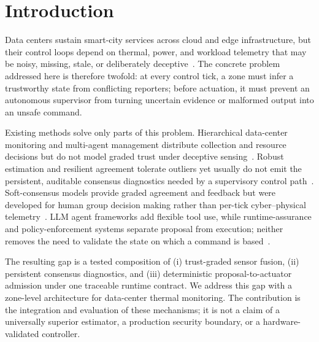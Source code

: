 \documentclass[smartcities,article,submit,moreauthors]{Definitions/mdpi}
\begin{document}
\section{Introduction}
\label{sec:introduction}

Data centers sustain smart-city services across cloud and edge infrastructure, but their control loops depend on thermal, power, and workload telemetry that may be noisy, missing, stale, or deliberately deceptive~\cite{khan2020smartcities,vitello2022,ilager2023}. The concrete problem addressed here is therefore twofold: at every control tick, a zone must infer a trustworthy state from conflicting reporters; before actuation, it must prevent an autonomous supervisor from turning uncertain evidence or malformed output into an unsafe command.

Existing methods solve only parts of this problem. Hierarchical data-center monitoring and multi-agent management distribute collection and resource decisions but do not model graded trust under deceptive sensing~\cite{jiang2019,yan2021,das2008,tesauro2004}. Robust estimation and resilient agreement tolerate outliers yet usually do not emit the persistent, auditable consensus diagnostics needed by a supervisory control path~\cite{pasqualetti2013,fawzi2014,leblanc2013}. Soft-consensus models provide graded agreement and feedback but were developed for human group decision making rather than per-tick cyber--physical telemetry~\cite{herreraviedma2002,herreraviedma2014}. LLM agent frameworks add flexible tool use, while runtime-assurance and policy-enforcement systems separate proposal from execution; neither removes the need to validate the state on which a command is based~\cite{yao2023react,popescu2026aiceberg,wheatman2022radics}.

The resulting gap is a tested composition of (i) trust-graded sensor fusion, (ii) persistent consensus diagnostics, and (iii) deterministic proposal-to-actuator admission under one traceable runtime contract. We address this gap with a zone-level architecture for data-center thermal monitoring. The contribution is the integration and evaluation of these mechanisms; it is not a claim of a universally superior estimator, a production security boundary, or a hardware-validated controller.
\end{document}
